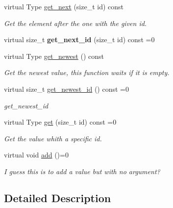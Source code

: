 \begin{DoxyCompactItemize}
\item 
virtual Type \hyperlink{classreal__time__tools_1_1ThreadsafeHistoryInterface_added71aaeb7d083fc12289814da69d1c}{get\+\_\+next} (size\+\_\+t id) const 
\begin{DoxyCompactList}\small\item\em Get the element after the one with the given id. \end{DoxyCompactList}\item 
virtual size\+\_\+t {\bfseries get\+\_\+next\+\_\+id} (size\+\_\+t id) const =0\hypertarget{classreal__time__tools_1_1ThreadsafeHistoryInterface_a8b2e92985bb4799f557f55550c7783dd}{}\label{classreal__time__tools_1_1ThreadsafeHistoryInterface_a8b2e92985bb4799f557f55550c7783dd}

\item 
virtual Type \hyperlink{classreal__time__tools_1_1ThreadsafeHistoryInterface_a8a10fa5abcb83d54fa33339e8800db6c}{get\+\_\+newest} () const 
\begin{DoxyCompactList}\small\item\em Get the newest value, this function waits if it is empty. \end{DoxyCompactList}\item 
virtual size\+\_\+t \hyperlink{classreal__time__tools_1_1ThreadsafeHistoryInterface_a3455ddd9e556045b17ab05307f4d3f51}{get\+\_\+newest\+\_\+id} () const =0
\begin{DoxyCompactList}\small\item\em get\+\_\+newest\+\_\+id \end{DoxyCompactList}\item 
virtual Type \hyperlink{classreal__time__tools_1_1ThreadsafeHistoryInterface_a34424c202bd02b70bb2178f506a67602}{get} (size\+\_\+t id) const =0
\begin{DoxyCompactList}\small\item\em Get the value whith a specific id. \end{DoxyCompactList}\item 
virtual void \hyperlink{classreal__time__tools_1_1ThreadsafeHistoryInterface_a3304dfddbf562b835745be3ff363ab17}{add} ()=0
\begin{DoxyCompactList}\small\item\em I guess this is to add a value but with no argument? \end{DoxyCompactList}\end{DoxyCompactItemize}


\subsection{Detailed Description}

